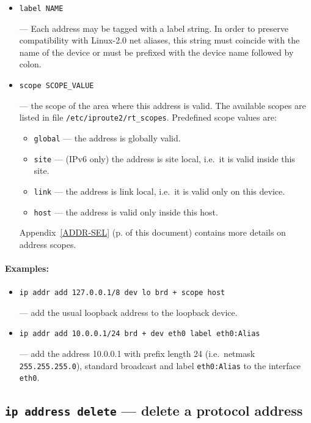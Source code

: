 \begin{itemize}
\item \verb|label NAME|

--- Each address may be tagged with a label string.
In order to preserve compatibility with Linux-2.0 net aliases,
this string must coincide with the name of the device or must be prefixed
with the device name followed by colon.


\item \verb|scope SCOPE_VALUE|

--- the scope of the area where this address is valid.
The available scopes are listed in file \verb|/etc/iproute2/rt_scopes|.
Predefined scope values are:

 \begin{itemize}
	\item \verb|global| --- the address is globally valid.
	\item \verb|site| --- (IPv6 only) the address is site local,
	i.e.\ it is valid inside this site.
	\item \verb|link| --- the address is link local, i.e.\ 
	it is valid only on this device.
	\item \verb|host| --- the address is valid only inside this host.
 \end{itemize}

Appendix~\ref{ADDR-SEL} (p.\pageref{ADDR-SEL} of this document)
contains more details on address scopes.

\end{itemize}

\paragraph{Examples:}
\begin{itemize}
\item \verb|ip addr add 127.0.0.1/8 dev lo brd + scope host|

--- add the usual loopback address to the loopback device.

\item \verb|ip addr add 10.0.0.1/24 brd + dev eth0 label eth0:Alias|

--- add the address 10.0.0.1 with prefix length 24 (i.e.\ netmask
\verb|255.255.255.0|), standard broadcast and label \verb|eth0:Alias|
to the interface \verb|eth0|.
\end{itemize}


\subsection{{\tt ip address delete} --- delete a protocol address}

